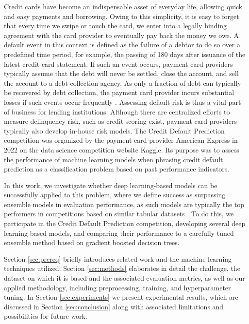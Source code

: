 \documentclass[runningheads]{llncs}
\begin{document}
Credit cards have become an indispensable asset of everyday life, allowing quick and easy payments and borrowing. Owing to this simplicity, it is easy to forget that every time we swipe or touch the card, we enter into a legally binding agreement with the card provider to eventually pay back the money we owe. A default event in this context is defined as the failure of a debtor to do so over a predefined time period, for example, the passing of 180 days after issuance of the latest credit card statement. If such an event occurs, payment card providers typically assume that the debt will never be settled, close the account, and sell the account to a debt collection agency. As only a fraction of debt can typically be recovered by debt collection, the payment card provider incurs substantial losses if such events occur frequently \cite{beck2017determines}.
Assessing default risk is thus a vital part of business for lending institutions. Although there are centralized efforts to measure delinquency risk, such as credit scoring exist, payment card providers typically also develop in-house risk models. The Credit Default Prediction competition was organized by the payment card provider American Express in 2022 on the data science competition website Kaggle. Its purpose was to assess the performance of machine learning models when phrasing credit default prediction as a classification problem based on past performance indicators.

In this work, we investigate whether deep learning-based models can be successfully applied to this problem, where we define success as surpassing ensemble models in evaluation performance, as such models are typically the top performers in competitions based on similar tabular datasets \cite{shwartz2022tabular}. To do this, we participate in the Credit Default Prediction competition, developing several deep learning based models, and comparing their performance to a carefully tuned ensemble method based on gradient boosted decision trees.

Section \ref{sec:prereq} briefly introduces related work and the machine learning techniques utilized. Section \ref{sec:methods} elaborates in detail the challenge, the dataset on which it is based and the associated evaluation metrics, as well as our applied methodology, including preprocessing, training, and hyperparameter tuning. In Section \ref{sec:experiments} we present experimental results, which are discussed in Section \ref{sec:conclusion} along with associated limitations and possibilities for future work.
\end{document}
